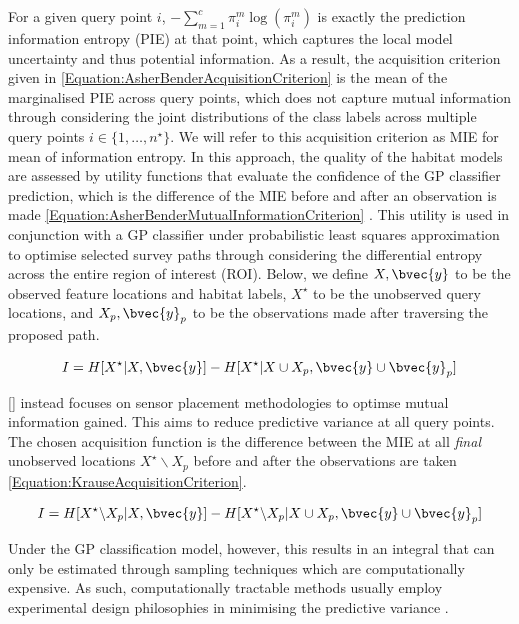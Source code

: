 \documentclass{article}
\newcommand{\incite}[1]{\citeauthor{#1} [\citeyear{#1}]}
\begin{document}
	For a given query point $i$, $- \sum_{m = 1}^{c} \pi^{m}_{i} \log(\pi^{m}_{i})$ is exactly the prediction information entropy (PIE) at that point, which captures the local model uncertainty and thus potential information. As a result, the acquisition criterion given in \eqref{Equation:AsherBenderAcquisitionCriterion} is the mean of the marginalised PIE across query points, which does not capture mutual information through considering the joint distributions of the class labels across multiple query points $i \in \{1, \dots, n^{\star}\}$. We will refer to this acquisition criterion as MIE for mean of information entropy. In this approach, the quality of the habitat models are assessed by utility functions that evaluate the confidence of the GP classifier prediction, which is the difference of the MIE before and after an observation is made \eqref{Equation:AsherBenderMutualInformationCriterion} \cite{Rigby:ROB20372}. This utility is used in conjunction with a GP classifier under probabilistic least squares approximation to optimise selected survey paths through considering the differential entropy across the entire region of interest (ROI). Below, we define $X, \bvec{y}$ to be the observed feature locations and habitat labels, $X^{\star}$ to be the unobserved query locations, and $X_{p}, \bvec{y}_{p}$ to be the observations made after traversing the proposed path.

	\begin{equation}
		I = H[X^{\star} | X, \bvec{y}] - H[X^{\star} | X \cup X_{p}, \bvec{y} \cup \bvec{y}_{p}]
	\label{Equation:AsherBenderMutualInformationCriterion}
	\end{equation}
	
	\incite{Krause:2008:NSP:1390681.1390689} instead focuses on sensor placement methodologies to optimse mutual information gained. This aims to reduce predictive variance at all query points. The chosen acquisition function is the difference between the MIE at all \textit{final} unobserved locations $X^{\star} \backslash X_{p}$ before and after the observations are taken \eqref{Equation:KrauseAcquisitionCriterion}.
	
	\begin{equation}
		I = H[X^{\star} \backslash X_{p} | X, \bvec{y}] - H[X^{\star} \backslash X_{p} | X \cup X_{p}, \bvec{y} \cup \bvec{y}_{p}]
	\label{Equation:KrauseAcquisitionCriterion}
	\end{equation}
	
	Under the GP classification model, however, this results in an integral that can only be estimated through sampling techniques which are computationally expensive. As such, computationally tractable methods usually employ experimental design philosophies in minimising the predictive variance \cite{AsherBender}.
	
\end{document}

